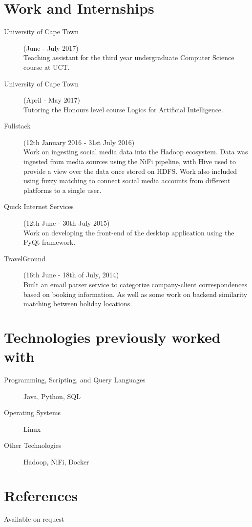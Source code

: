 \documentclass[margin,line,a4paper]{resume}
\begin{document}
\begin{resume}
        \section{\mysidestyle Work and Internships}
            \begin{description}
            	\item[University of Cape Town] (June - July 2017) \\
            		Teaching assistant for the third year undergraduate Computer Science course at UCT.

            	\item[University of Cape Town] (April - May 2017) \\
            		Tutoring the Honours level course Logics for Artificial Intelligence.

                \item[Fullstack] (12th January 2016 - 31st July 2016) \\
                    Work on ingesting social media data into the Hadoop ecosystem. Data was ingested from media sources using the NiFi pipeline, with Hive used to provide a view over the data once stored on HDFS. Work also included using fuzzy matching to connect social media accounts from different platforms to a single user.

                \item[Quick Internet Services] (12th June - 30th July 2015) \\
                    Work on developing the front-end of the desktop application using the PyQt framework.

                \item[TravelGround] (16th June - 18th of July, 2014) \\
                    Built an email parser service to categorize company-client correspondences based on booking information. As well as some work on backend similarity matching between holiday locations.

            \end{description}

        \section{\mysidestyle Technologies previously worked with}
        	\begin{description}
	        	\item [Programming, Scripting, and Query Languages] Java, Python, SQL
	 			\item [Operating Systems] Linux
	 			\item [Other Technologies] Hadoop, NiFi, Docker
	 		\end{description}

       	\section{\mysidestyle References}
            Available on request
    \end{resume}
\end{document}
